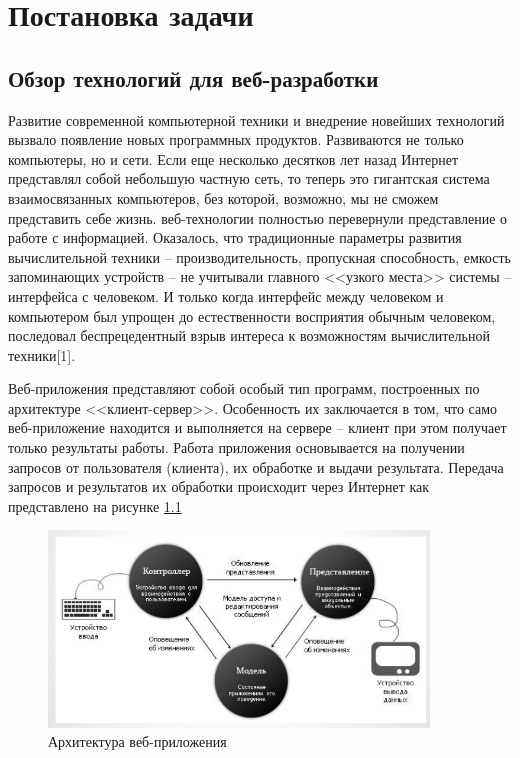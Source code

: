 \chapter{Постановка задачи}



\section{Обзор технологий для веб-разработки}

Развитие современной компьютерной техники и внедрение новейших технологий вызвало появление новых программных продуктов. 
Развиваются не только компьютеры, но и сети. Если еще несколько десятков лет назад Интернет представлял собой небольшую частную сеть, то теперь это гигантская система взаимосвязанных компьютеров, без которой, возможно, мы не сможем представить себе жизнь.
веб-технологии полностью перевернули представление о работе с информацией. Оказалось, что традиционные параметры развития вычислительной техники -- производительность, пропускная способность, емкость запоминающих устройств -- не учитывали главного <<узкого места>> системы -- интерфейса с человеком. И только когда интерфейс между человеком и компьютером был упрощен до естественности восприятия обычным человеком, последовал беспрецедентный взрыв интереса к возможностям вычислительной техники[1].

Веб-приложения представляют собой особый тип программ, построенных по архитектуре <<клиент-сервер>>. Особенность их заключается в том, что само веб-приложение находится и выполняется на сервере -- клиент при этом получает только результаты работы. Работа приложения основывается на получении запросов от пользователя (клиента), их обработке и выдачи результата. Передача запросов и результатов их обработки происходит через Интернет как представлено на рисунке \ref{web}

\begin{figure}[ht]
\center\includegraphics[width=0.9\textwidth]{mvc}
\caption{Архитектура веб-приложения}\label{web}
\end{figure}

